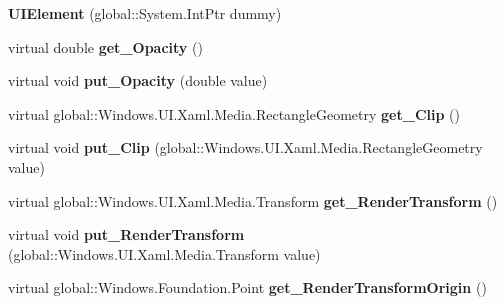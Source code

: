 \begin{DoxyCompactItemize}
{\bfseries U\+I\+Element} (global\+::\+System.\+Int\+Ptr dummy)
\item 
\mbox{\label{class_windows_1_1_u_i_1_1_xaml_1_1_u_i_element_a0653356423d6b2e82584608c68968d68}} 
virtual double {\bfseries get\+\_\+\+Opacity} ()
\item 
\mbox{\label{class_windows_1_1_u_i_1_1_xaml_1_1_u_i_element_a1e20878dd2197db4f727f1ac47480c0a}} 
virtual void {\bfseries put\+\_\+\+Opacity} (double value)
\item 
\mbox{\label{class_windows_1_1_u_i_1_1_xaml_1_1_u_i_element_aadf0b8c76e7c0a2932dead3fd44e570c}} 
virtual global\+::\+Windows.\+U\+I.\+Xaml.\+Media.\+Rectangle\+Geometry {\bfseries get\+\_\+\+Clip} ()
\item 
\mbox{\label{class_windows_1_1_u_i_1_1_xaml_1_1_u_i_element_aa47613e3e5d780689f098981803a451d}} 
virtual void {\bfseries put\+\_\+\+Clip} (global\+::\+Windows.\+U\+I.\+Xaml.\+Media.\+Rectangle\+Geometry value)
\item 
\mbox{\label{class_windows_1_1_u_i_1_1_xaml_1_1_u_i_element_a9556f4a073076052be93c39cd96cb6a0}} 
virtual global\+::\+Windows.\+U\+I.\+Xaml.\+Media.\+Transform {\bfseries get\+\_\+\+Render\+Transform} ()
\item 
\mbox{\label{class_windows_1_1_u_i_1_1_xaml_1_1_u_i_element_af319cc6e684f42a4fb4719f262cf5f5d}} 
virtual void {\bfseries put\+\_\+\+Render\+Transform} (global\+::\+Windows.\+U\+I.\+Xaml.\+Media.\+Transform value)
\item 
\mbox{\label{class_windows_1_1_u_i_1_1_xaml_1_1_u_i_element_a160f3818573614194babfda698182355}} 
virtual global\+::\+Windows.\+Foundation.\+Point {\bfseries get\+\_\+\+Render\+Transform\+Origin} ()
\item 
\mbox{\label{class_windows_1_1_u_i_1_1_xaml_1_1_u_i_element_a3384cc317262d95a77573d76f771778d}} 

\end{DoxyCompactItemize}
